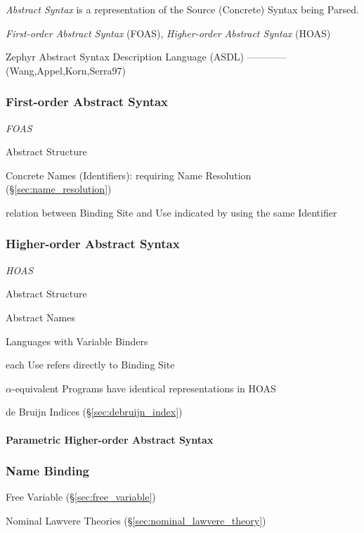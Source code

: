 \emph{Abstract Syntax} is a representation of the Source (Concrete)
Syntax being Parsed.

\emph{First-order Abstract Syntax} (FOAS), \emph{Higher-order Abstract
  Syntax} (HOAS)

\fist Zephyr Abstract Syntax Description Language (ASDL) ------------
(Wang,Appel,Korn,Serra97)



\subsubsection{First-order Abstract Syntax}\label{sec:foas}

\emph{FOAS}

Abstract Structure

Concrete Names (Identifiers): requiring Name Resolution
(\S\ref{sec:name_resolution})

relation between Binding Site and Use indicated by using the same
Identifier



\subsubsection{Higher-order Abstract Syntax}\label{sec:hoas}

\emph{HOAS}

Abstract Structure

Abstract Names

Languages with Variable Binders %

each Use refers directly to Binding Site

$\alpha$-equivalent Programs have identical representations in HOAS

de Bruijn Indices (\S\ref{sec:debruijn_index})



\paragraph{Parametric Higher-order Abstract Syntax}
\label{sec:phoas}\hfill



\subsubsection{Name Binding}\label{sec:name_binding}

Free Variable (\S\ref{sec:free_variable})

\fist Nominal Lawvere Theories (\S\ref{sec:nominal_lawvere_theory})

